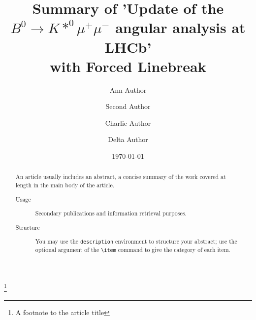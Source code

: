 \documentclass[%
 reprint,
 amsmath,amssymb,
 aps,
]{revtex4-2}
\begin{document}

\title{Summary of 'Update of the $B^0 \longrightarrow K*^0\mu^+\mu^-$ angular analysis at LHCb'\\with Forced Linebreak}%
\thanks{A footnote to the article title}%

\author{Ann Author}
\author{Second Author}%
%


\author{Charlie Author}
%
%
\author{Delta Author}
%


\date{\today}%

\begin{abstract}
An article usually includes an abstract, a concise summary of the work
covered at length in the main body of the article.
\begin{description}
\item[Usage]
Secondary publications and information retrieval purposes.
\item[Structure]
You may use the \texttt{description} environment to structure your abstract;
use the optional argument of the \verb+\item+ command to give the category of each item.
\end{description}
\end{abstract}


\maketitle
\end{document}
